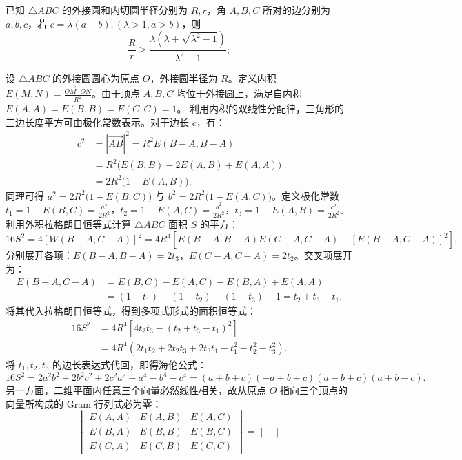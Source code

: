 \begin{example}
已知 \(\triangle ABC\) 的外接圆和内切圆半径分别为 \(R,r\)，角 \(A,B,C\) 所对的边分别为 \(a,b,c\)，若 \(c = \lambda(a-b), (\lambda>1,a>b)\)，则
\[
\frac{R}{r} \ge \frac{\lambda(\lambda+\sqrt{\lambda^2-1})}{\lambda^2-1};
\]
\end{example}
\begin{solution}
设 $\triangle ABC$ 的外接圆圆心为原点 $O$，外接圆半径为 $R$。定义内积 $E(M,N) = \frac{\overrightarrow{OM} \cdot \overrightarrow{ON}}{R^2}$。由于顶点 $A,B,C$ 均位于外接圆上，满足自内积 $E(A,A) = E(B,B) = E(C,C) = 1$。
利用内积的双线性分配律，三角形的三边长度平方可由极化常数表示。对于边长 $c$，有：
\begin{align*}
c^2 &= |\overrightarrow{AB}|^2 = R^2 E(B-A, B-A) \\
&= R^2 \big( E(B,B) - 2E(A,B) + E(A,A) \big) \\
&= 2R^2 \big( 1 - E(A,B) \big).
\end{align*}
同理可得 $a^2 = 2R^2 \big( 1 - E(B,C) \big)$ 与 $b^2 = 2R^2 \big( 1 - E(A,C) \big)$。定义极化常数 $t_1 = 1 - E(B,C) = \frac{a^2}{2R^2}$，$t_2 = 1 - E(A,C) = \frac{b^2}{2R^2}$，$t_3 = 1 - E(A,B) = \frac{c^2}{2R^2}$。\\
利用外积拉格朗日恒等式计算 $\triangle ABC$ 面积 $S$ 的平方：
\[
16S^2 = 4 [W(B-A, C-A)]^2 = 4R^4 \left[ E(B-A, B-A)E(C-A, C-A) - [E(B-A, C-A)]^2 \right].
\]
分别展开各项：$E(B-A, B-A) = 2t_3$，$E(C-A, C-A) = 2t_2$。交叉项展开为：
\begin{align*}
E(B-A, C-A) &= E(B,C) - E(A,C) - E(B,A) + E(A,A) \\
&= (1-t_1) - (1-t_2) - (1-t_3) + 1 = t_2 + t_3 - t_1.
\end{align*}
将其代入拉格朗日恒等式，得到多项式形式的面积恒等式：
\begin{align*}
16S^2 &= 4R^4 \left[ 4t_2 t_3 - (t_2 + t_3 - t_1)^2 \right] \\
&= 4R^4 (2t_1 t_2 + 2t_2 t_3 + 2t_3 t_1 - t_1^2 - t_2^2 - t_3^2).
\end{align*}
将 $t_1, t_2, t_3$ 的边长表达式代回，即得海伦公式：
\[
16S^2 = 2a^2b^2 + 2b^2c^2 + 2c^2a^2 - a^4 - b^4 - c^4 = (a+b+c)(-a+b+c)(a-b+c)(a+b-c).
\]
另一方面，二维平面内任意三个向量必然线性相关，故从原点 $O$ 指向三个顶点的向量所构成的 Gram 行列式必为零：
\[
\begin{vmatrix} 
E(A,A) & E(A,B) & E(A,C) \\ 
E(B,A) & E(B,B) & E(B,C) \\ 
E(C,A) & E(C,B) & E(C,C) 
\end{vmatrix} = \begin{vmatrix} 

\end{vmatrix}\]
\end{solution}
